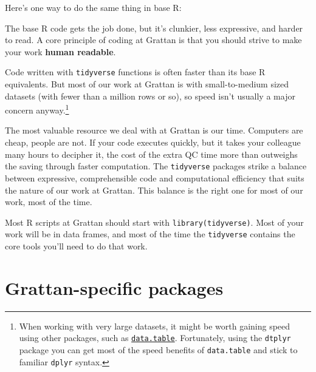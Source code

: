 \documentclass[
]{book}
\newenvironment{Shaded}{\begin{snugshade}}{\end{snugshade}}
\newcommand{\DataTypeTok}[1]{\textcolor[rgb]{0.13,0.29,0.53}{#1}}
\newcommand{\DecValTok}[1]{\textcolor[rgb]{0.00,0.00,0.81}{#1}}
\newcommand{\KeywordTok}[1]{\textcolor[rgb]{0.13,0.29,0.53}{\textbf{#1}}}
\newcommand{\NormalTok}[1]{#1}
\newcommand{\OperatorTok}[1]{\textcolor[rgb]{0.81,0.36,0.00}{\textbf{#1}}}
\newcommand{\StringTok}[1]{\textcolor[rgb]{0.31,0.60,0.02}{#1}}
\begin{document}
Here's one way to do the same thing in base R:

\begin{Shaded}
\end{Shaded}

The base R code gets the job done, but it's clunkier, less expressive, and harder to read. A core principle of coding at Grattan is that you should strive to make your work \textbf{human readable}.

Code written with \texttt{tidyverse} functions is often faster than its base R equivalents. But most of our work at Grattan is with small-to-medium sized datasets (with fewer than a million rows or so), so speed isn't usually a major concern anyway.\footnote{When working with very large datasets, it might be worth gaining speed using other packages, such as \href{https://cran.r-project.org/web/packages/data.table/vignettes/datatable-intro.html}{\texttt{data.table}}. Fortunately, using the \texttt{dtplyr} package you can get most of the speed benefits of \texttt{data.table} and stick to familiar \texttt{dplyr} syntax.}

The most valuable resource we deal with at Grattan is our time. Computers are cheap, people are not. If your code executes quickly, but it takes your colleague many hours to decipher it, the cost of the extra QC time more than outweighs the saving through faster computation. The \texttt{tidyverse} packages strike a balance between expressive, comprehensible code and computational efficiency that suits the nature of our work at Grattan. This balance is the right one for most of our work, most of the time.

Most R scripts at Grattan should start with \texttt{library(tidyverse)}. Most of your work will be in data frames, and most of the time the \texttt{tidyverse} contains the core tools you'll need to do that work.

\hypertarget{grattan-specific-packages}{%
\section{Grattan-specific packages}\label{grattan-specific-packages}}
\end{document}
